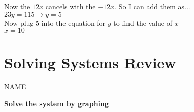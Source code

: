 \documentclass[11pt]{article}
\begin{document}
Now the $12x$ cancels with the $-12x$. So I can add them as...\\

$23y=115 \rightarrow y=5$\\

Now plug $5$ into the equation for $y$ to find the value of $x$\\

$x=10$\\

\pagebreak

\section*{Solving Systems Review}

NAME\underline{\hspace{3in}}



\textbf{Solve the system by graphing}\\
\end{document}
